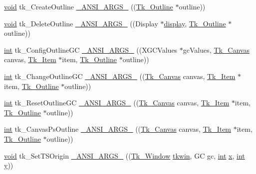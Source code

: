\begin{DoxyCompactItemize}
\item 
\hyperlink{tk_8h_aba408b7cd755a96426e004c015f5de8e}{void} tk\+\_\+\+Create\+Outline \hyperlink{struct_tk_stubs_a175eda6b615bcb56afdc61f25b4434be}{\+\_\+\+A\+N\+S\+I\+\_\+\+A\+R\+G\+S\+\_\+} ((\hyperlink{struct_tk___outline}{Tk\+\_\+\+Outline} $\ast$outline))
\item 
\hyperlink{tk_8h_aba408b7cd755a96426e004c015f5de8e}{void} tk\+\_\+\+Delete\+Outline \hyperlink{struct_tk_stubs_a2c6f602e1e35c0fb77174c7f549fd9bb}{\+\_\+\+A\+N\+S\+I\+\_\+\+A\+R\+G\+S\+\_\+} ((Display $\ast$\hyperlink{tk_8h_afc08b650bd5c7e58f8133cc830a2ef84}{display}, \hyperlink{struct_tk___outline}{Tk\+\_\+\+Outline} $\ast$outline))
\item 
\hyperlink{tk_8h_a83f82f76e7fed06f4c49d2db94028a6d}{int} tk\+\_\+\+Config\+Outline\+GC \hyperlink{struct_tk_stubs_a14e68d58d889f381cd9c14816459da78}{\+\_\+\+A\+N\+S\+I\+\_\+\+A\+R\+G\+S\+\_\+} ((X\+G\+C\+Values $\ast$gc\+Values, \hyperlink{tk_8h_a48928ad64693bd6179f628ad883f3250}{Tk\+\_\+\+Canvas} canvas, \hyperlink{struct_tk___item}{Tk\+\_\+\+Item} $\ast$item, \hyperlink{struct_tk___outline}{Tk\+\_\+\+Outline} $\ast$outline))
\item 
\hyperlink{tk_8h_a83f82f76e7fed06f4c49d2db94028a6d}{int} tk\+\_\+\+Change\+Outline\+GC \hyperlink{struct_tk_stubs_a55657faa738d7943c1e4c518a842f0ea}{\+\_\+\+A\+N\+S\+I\+\_\+\+A\+R\+G\+S\+\_\+} ((\hyperlink{tk_8h_a48928ad64693bd6179f628ad883f3250}{Tk\+\_\+\+Canvas} canvas, \hyperlink{struct_tk___item}{Tk\+\_\+\+Item} $\ast$item, \hyperlink{struct_tk___outline}{Tk\+\_\+\+Outline} $\ast$outline))
\item 
\hyperlink{tk_8h_a83f82f76e7fed06f4c49d2db94028a6d}{int} tk\+\_\+\+Reset\+Outline\+GC \hyperlink{struct_tk_stubs_af972c16f3e1771074731fa2ce995afee}{\+\_\+\+A\+N\+S\+I\+\_\+\+A\+R\+G\+S\+\_\+} ((\hyperlink{tk_8h_a48928ad64693bd6179f628ad883f3250}{Tk\+\_\+\+Canvas} canvas, \hyperlink{struct_tk___item}{Tk\+\_\+\+Item} $\ast$item, \hyperlink{struct_tk___outline}{Tk\+\_\+\+Outline} $\ast$outline))
\item 
\hyperlink{tk_8h_a83f82f76e7fed06f4c49d2db94028a6d}{int} tk\+\_\+\+Canvas\+Ps\+Outline \hyperlink{struct_tk_stubs_a14251e308d6644aed9ecf835d150f48b}{\+\_\+\+A\+N\+S\+I\+\_\+\+A\+R\+G\+S\+\_\+} ((\hyperlink{tk_8h_a48928ad64693bd6179f628ad883f3250}{Tk\+\_\+\+Canvas} canvas, \hyperlink{struct_tk___item}{Tk\+\_\+\+Item} $\ast$item, \hyperlink{struct_tk___outline}{Tk\+\_\+\+Outline} $\ast$outline))
\item 
\hyperlink{tk_8h_aba408b7cd755a96426e004c015f5de8e}{void} tk\+\_\+\+Set\+T\+S\+Origin \hyperlink{struct_tk_stubs_a972b6cc408e91d1b17d2a7fe5d730b35}{\+\_\+\+A\+N\+S\+I\+\_\+\+A\+R\+G\+S\+\_\+} ((\hyperlink{tk_8h_ab756137de3ee74edc2501bd0d761e37c}{Tk\+\_\+\+Window} \hyperlink{tk_8h_a35df722e7e1b6efd651683b8be7c1490}{tkwin}, GC gc, \hyperlink{tk_8h_a83f82f76e7fed06f4c49d2db94028a6d}{int} \hyperlink{tk_8h_a61ebd54d47cc56787649a3b8f126bda1}{x}, \hyperlink{tk_8h_a83f82f76e7fed06f4c49d2db94028a6d}{int} \hyperlink{tk_8h_a40f4f3601c0eaa8ca46b1a164264696d}{y}))

\end{DoxyCompactItemize}
